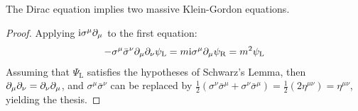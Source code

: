 \begin{proposition}{}{}
  The Dirac equation implies two massive Klein-Gordon equations.
\end{proposition}

\begin{proofbox}
  \begin{proof}
    Applying $ \mathrm{i} \sigma^\mu \partial_\mu $ to the first equation:
    \begin{equation*}
      - \sigma^\mu \bar{\sigma}^\nu \partial_\mu \partial_\nu \psi_\text{L} = m \mathrm{i} \sigma^\mu \partial_\mu \psi_\text{R} = m^2 \psi_\text{L}
    \end{equation*}
    Assuming that $ \Psi_\text{L} $ satisfies the hypotheses of Schwarz's Lemma, then $ \partial_\mu \partial_\nu = \partial_\nu \partial_\mu $, and $ \sigma^\mu \bar{\sigma}^\nu $ can be replaced by $ \frac{1}{2} (\sigma^\nu \bar{\sigma}^\mu + \sigma^\nu \bar{\sigma}^\mu) = \frac{1}{2} (2 \eta^{\mu \nu}) = \eta^{\mu \nu} $, yielding the thesis.
  \end{proof}
\end{proofbox}


